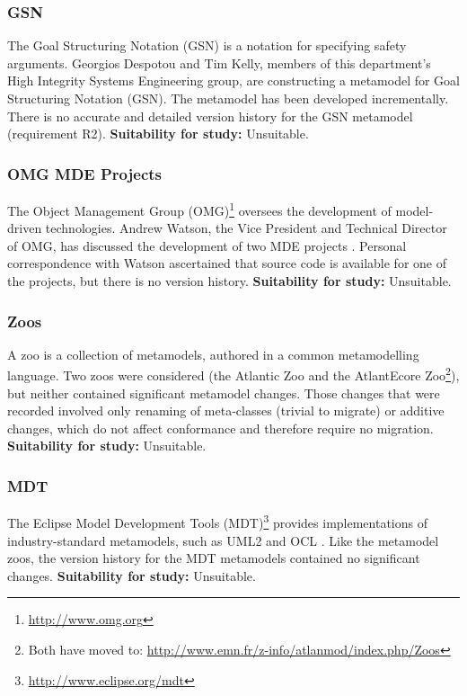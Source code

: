 \subsubsection{GSN}
\label{par:gsn}
The Goal Structuring Notation (GSN) \cite{kelly99thesis} is a notation for specifying safety arguments. Georgios Despotou and Tim Kelly, members of this department's High Integrity Systems Engineering group, are constructing a metamodel for Goal Structuring Notation (GSN). The metamodel has been developed incrementally. There is no accurate and detailed version history for the GSN metamodel (requirement R2). \textbf{Suitability for study:} Unsuitable.

\subsubsection{OMG MDE Projects}
\label{par:omg}
The Object Management Group (OMG)\footnote{\url{http://www.omg.org}} oversees the development of model-driven technologies. Andrew Watson, the Vice President and Technical Director of OMG, has discussed the development of two MDE projects \cite{watson08mdahistory}. Personal correspondence with Watson ascertained that source code is available for one of the projects, but there is no version history. \textbf{Suitability for study:} Unsuitable.


\subsubsection{Zoos}
\label{par:zoos}
A zoo is a collection of metamodels, authored in a common metamodelling language. Two zoos were considered (the Atlantic Zoo and the AtlantEcore Zoo\footnote{Both have moved to: \url{http://www.emn.fr/z-info/atlanmod/index.php/Zoos}}), but neither contained significant metamodel changes. Those changes that were recorded involved only renaming of meta-classes (trivial to migrate) or additive changes, which do not affect conformance and therefore require no migration. \textbf{Suitability for study:} Unsuitable.

\subsubsection{MDT}
The Eclipse Model Development Tools (MDT)\footnote{\url{http://www.eclipse.org/mdt}} provides implementations of industry-standard metamodels, such as UML2 \cite{uml212} and OCL \cite{ocl2}. Like the metamodel zoos, the version history for the MDT metamodels contained no significant changes. \textbf{Suitability for study:} Unsuitable.

